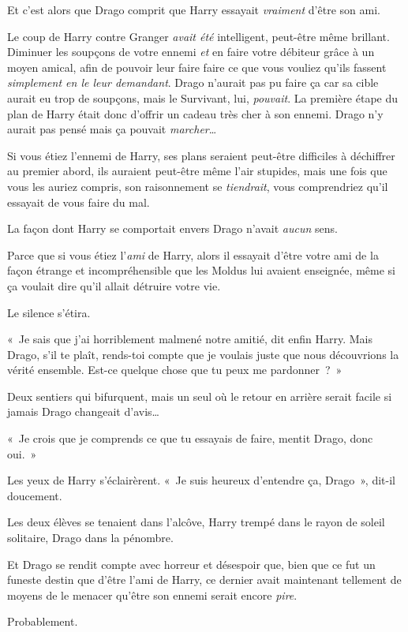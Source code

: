 Et c'est alors que Drago comprit que Harry essayait \emph{vraiment} d'être son ami.

Le coup de Harry contre Granger \emph{avait été} intelligent, peut-être même brillant.
Diminuer les soupçons de votre ennemi \emph{et} en faire votre débiteur grâce à un moyen amical, afin de pouvoir leur faire faire ce que vous vouliez qu'ils fassent \emph{simplement en le leur demandant}.
Drago n'aurait pas pu faire ça car sa cible aurait eu trop de soupçons, mais le Survivant, lui, \emph{pouvait}.
La première étape du plan de Harry était donc d'offrir un cadeau très cher à son ennemi.
Drago n'y aurait pas pensé mais ça pouvait \emph{marcher}…

Si vous étiez l'ennemi de Harry, ses plans seraient peut-être difficiles à déchiffrer au premier abord, ils auraient peut-être même l'air stupides, mais une fois que vous les auriez compris, son raisonnement se \emph{tiendrait}, vous comprendriez qu'il essayait de vous faire du mal.

La façon dont Harry se comportait envers Drago n'avait \emph{aucun} sens.

Parce que si vous étiez l'\emph{ami} de Harry, alors il essayait d'être votre ami de la façon étrange et incompréhensible que les Moldus lui avaient enseignée, même si ça voulait dire qu'il allait détruire votre vie.

Le silence s'étira.

«~Je sais que j'ai horriblement malmené notre amitié, dit enfin Harry.
Mais Drago, s'il te plaît, rends-toi compte que je voulais juste que nous découvrions la vérité ensemble.
Est-ce quelque chose que tu peux me pardonner~?~»

Deux sentiers qui bifurquent, mais un seul où le retour en arrière serait facile si jamais Drago changeait d'avis…

«~Je crois que je comprends ce que tu essayais de faire, mentit Drago, donc oui.~»

Les yeux de Harry s'éclairèrent.
«~Je suis heureux d'entendre ça, Drago~», dit-il doucement.

Les deux élèves se tenaient dans l'alcôve, Harry trempé dans le rayon de soleil solitaire, Drago dans la pénombre.

Et Drago se rendit compte avec horreur et désespoir que, bien que ce fut un funeste destin que d'être l'ami de Harry, ce dernier avait maintenant tellement de moyens de le menacer qu'être son ennemi serait encore \emph{pire}.

Probablement.

